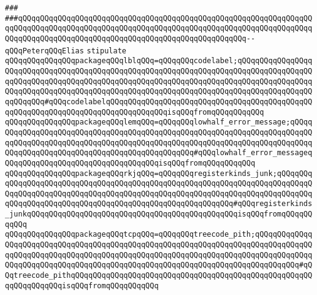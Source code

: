 \verb|###|\newline
\verb|###qQQqqQQqqQQqqQQqqQQqqQQqqQQqqQQqqQQqqQQqqQQqqQQqqQQqqQQqqQQqqQQqqQQqqQQqqQQqqQQqqQQqqQQqqQQqqQQqqQQqqQQqqQQqqQQqqQQqqQQqqQQqqQQqqQQqqQQqqQQqqQQqqQQqqQQqqQQqqQQqqQQqqQQqqQQqqQQqqQQqqQQqqQQqqQQq--qQQqPeterqQQqElias|\newline
\newline
\newline
\verb|stipulate|\newline
\verb|qQQqqQQqqQQqqQQqpackageqQQqlblqQQq=qQQqqQQqcodelabel;qQQqqQQqqQQqqQQqqQQqqQQqqQQqqQQqqQQqqQQqqQQqqQQqqQQqqQQqqQQqqQQqqQQqqQQqqQQqqQQqqQQqqQQqqQQqqQQqqQQqqQQqqQQqqQQqqQQqqQQqqQQqqQQqqQQqqQQqqQQqqQQqqQQqqQQqqQQqqQQqqQQqqQQqqQQqqQQqqQQqqQQqqQQqqQQqqQQqqQQqqQQqqQQqqQQqqQQqqQQqqQQqqQQqqQQqqQQq#qQQqcodelabelqQQqqQQqqQQqqQQqqQQqqQQqqQQqqQQqqQQqqQQqqQQqqQQqqQQqqQQqqQQqqQQqqQQqqQQqqQQqqQQqqQQqisqQQqfromqQQqqQQqqQQq|\newline
\verb|qQQqqQQqqQQqqQQqpackageqQQqlemqQQq=qQQqqQQqlowhalf_error_message;qQQqqQQqqQQqqQQqqQQqqQQqqQQqqQQqqQQqqQQqqQQqqQQqqQQqqQQqqQQqqQQqqQQqqQQqqQQqqQQqqQQqqQQqqQQqqQQqqQQqqQQqqQQqqQQqqQQqqQQqqQQqqQQqqQQqqQQqqQQqqQQqqQQqqQQqqQQqqQQqqQQqqQQqqQQqqQQqqQQqqQQqqQQq#qQQqlowhalf_error_messageqQQqqQQqqQQqqQQqqQQqqQQqqQQqqQQqqQQqisqQQqfromqQQqqQQqqQQq|\newline
\verb|qQQqqQQqqQQqqQQqpackageqQQqrkjqQQq=qQQqqQQqregisterkinds_junk;qQQqqQQqqQQqqQQqqQQqqQQqqQQqqQQqqQQqqQQqqQQqqQQqqQQqqQQqqQQqqQQqqQQqqQQqqQQqqQQqqQQqqQQqqQQqqQQqqQQqqQQqqQQqqQQqqQQqqQQqqQQqqQQqqQQqqQQqqQQqqQQqqQQqqQQqqQQqqQQqqQQqqQQqqQQqqQQqqQQqqQQqqQQqqQQqqQQqqQQq#qQQqregisterkinds_junkqQQqqQQqqQQqqQQqqQQqqQQqqQQqqQQqqQQqqQQqqQQqqQQqisqQQqfromqQQqqQQqqQQq|\newline
\verb|qQQqqQQqqQQqqQQqpackageqQQqtcpqQQq=qQQqqQQqtreecode_pith;qQQqqQQqqQQqqQQqqQQqqQQqqQQqqQQqqQQqqQQqqQQqqQQqqQQqqQQqqQQqqQQqqQQqqQQqqQQqqQQqqQQqqQQqqQQqqQQqqQQqqQQqqQQqqQQqqQQqqQQqqQQqqQQqqQQqqQQqqQQqqQQqqQQqqQQqqQQqqQQqqQQqqQQqqQQqqQQqqQQqqQQqqQQqqQQqqQQqqQQqqQQqqQQqqQQqqQQqqQQq#qQQqtreecode_pithqQQqqQQqqQQqqQQqqQQqqQQqqQQqqQQqqQQqqQQqqQQqqQQqqQQqqQQqqQQqqQQqqQQqisqQQqfromqQQqqQQqqQQq|\newline
